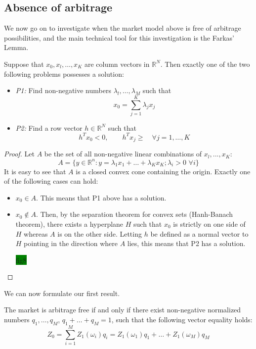 \subsection{Absence of arbitrage}
We now go on to investigate when the market model above is free of arbitrage possibilities, and the main technical tool for this investigation is the Farkas' Lemma.
\begin{lemma}
    Suppose that $x_0,x_l,\dots,x_K$ are column vectors in $\mathbb{R}^N$. Then exactly one of the two following problems possesses a solution:
    \begin{itemize}
        \item \emph{P1:} Find non-negative numbers $\lambda_l,\dots,\lambda_M$ such that 
        \begin{equation}
            x_0 = \sum^K_{j=1} \lambda_j x_j
        \end{equation}
        \item \emph{P2:} Find a row vector $h\in\mathbb{R}^N$ such that
        \begin{equation}\label{ineq}
            h^Tx_0<0, \qquad h^Tx_j\ge \quad\forall j=1,\dots,K
        \end{equation}
    \end{itemize}
\end{lemma}
\begin{proof}
    Let $A$ be the set of all non-negative linear combinations of $x_l,...,x_K$: 
    $$A=\{y\in\mathbb{R}^n:y=\lambda_1x_1+\dots+\lambda_Kx_K; \lambda_i>0\,\,\forall i\}$$
    It is easy to see that $A$ is a closed convex cone containing the origin. Exactly one of the following cases can hold:
    \begin{itemize}
    \item $x_0\in A$. This means that P1 above has a solution.
    \item $x_0\notin A$. Then, by the separation theorem for convex sets (Hanh-Banach theorem), there exists a hyperplane $H$ such that $x_0$ is strictly on one side of $H$ whereas $A$ is on the other side. Letting $h$ be defined as a normal vector to $H$ pointing in the direction where $A$ lies, this means that P2 has a solution.
    \begin{center}
        \colorbox{green}{fig8}
    \end{center}
    \end{itemize}
\end{proof}
We can now formulate our first result.
\begin{theorem}\label{arbfreeth}
    The market is arbitrage free if and only if there exist non-negative normalized numbers $q_1,\dots,q_M$, $q_1+\dots+q_M=1$, such that the following vector equality holds:
    \begin{equation}\label{Z0}
        Z_0 = \sum^M_{i=1} Z_1(\omega_i)q_i = Z_1(\omega_1)q_1 + \dots + Z_1(\omega_M)q_M
    \end{equation}
\end{theorem}

